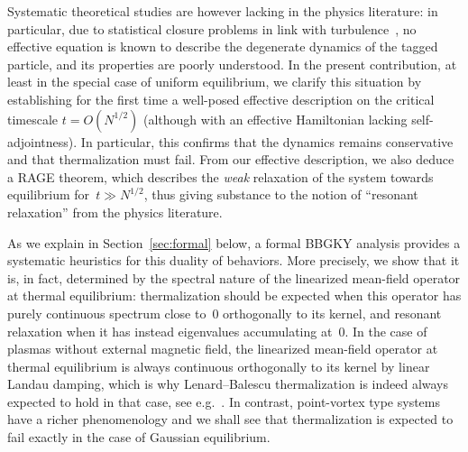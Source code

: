 \documentclass[a4paper,11pt,reqno,noindent]{amsart}
\theoremstyle{plain}
\numberwithin{equation}{section}
\newcommand{\3}{|\!|\!|}
\begin{document}
\begin{enumerate}[---]
Systematic theoretical studies are however lacking in the physics literature: in particular, due to statistical closure problems in link with turbulence~\cite{Krommes-02}, no effective equation is known to describe the degenerate dynamics of the tagged particle, and its properties are poorly understood.
In the present contribution, {at least in the special case of uniform equilibrium,} we clarify this situation by establishing for the first time a well-posed effective description on the critical timescale $t=O(N^{1/2})$ (although with an effective Hamiltonian lacking self-adjointness). {In particular, this confirms that the dynamics remains conservative and that thermalization must fail.
From our effective description, we also deduce a RAGE theorem, which describes the {\it weak} relaxation of the system towards equilibrium for~$t\gg N^{1/2}$, thus giving substance to the notion of ``resonant relaxation'' from the physics literature.}
\end{enumerate}
{As we explain in Section~\ref{sec:formal} below, a formal BBGKY analysis provides a systematic heuristics for this duality of behaviors. More precisely, we show that it
is, in fact, determined by the spectral nature of the linearized mean-field operator at thermal equilibrium: thermalization should be expected when this operator has purely continuous spectrum close to~$0$ orthogonally to its kernel, and resonant relaxation when it has instead eigenvalues accumulating at~$0$.}
In the case of plasmas without external magnetic field, the linearized mean-field operator at thermal equilibrium is always continuous orthogonally to its kernel by linear Landau damping, which is why Lenard--Balescu thermalization is indeed always expected to hold in that case, see e.g.~\cite{DSR-21}. {In contrast, point-vortex type systems have a richer phenomenology and we shall see that thermalization is expected to fail exactly in the case of Gaussian equilibrium.}
\end{document}
